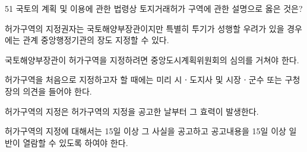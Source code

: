 \begin{question}{51}
국토의 계획 및 이용에 관한 법령상 토지거래허가 구역에 관한 설명으로 옳은 것은?
\begin{choices}
  \item 허가구역의 지정권자는 국토해양부장관이지만 특별히 투기가 성행할 우려가 있을 경우에는 관계 중앙행정기관의 장도 지정할 수 있다.
  \item 국토해양부장관이 허가구역을 지정하려면 중앙도시계획위원회의 심의를 거쳐야 한다.
  \item 허가구역을 처음으로 지정하고자 할 때에는 미리 시ㆍ도지사 및 시장ㆍ군수 또는 구청장의 의견을 들어야 한다.
  \item 허가구역의 지정은 허가구역의 지정을 공고한 날부터 그 효력이 발생한다.
  \item 허가구역의 지정에 대해서는 15일 이상 그 사실을 공고하고 공고내용을 15일 이상 일반이 열람할 수 있도록 하여야 한다.
\end{choices}
\end{question}
